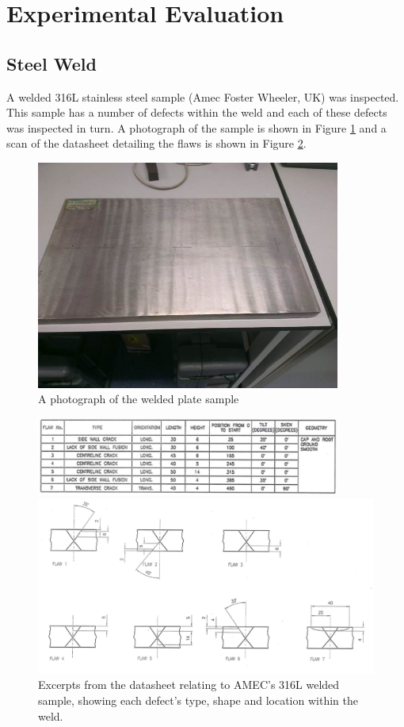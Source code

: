  \section{Experimental Evaluation}

 \subsection{Steel Weld}

 A welded 316L stainless steel sample (Amec Foster Wheeler, UK) was inspected. This sample has a number of defects within the weld and each of these defects was inspected in turn. A photograph of the sample is shown in Figure \ref{fig:amec_1} and a scan of the datasheet detailing the flaws is shown in Figure \ref{fig:amec2}.

\begin{figure}[htb]
\centering
		\includegraphics[width=100mm]{AMEC_1.png}
		\caption{A photograph of the welded plate sample}
		\label{fig:amec_1}
\end{figure}

\begin{figure}[p]
\centering
		\includegraphics[width=100mm]{AMEC2_1.png}
		
		\vspace{10mm}
		
		\includegraphics[width=\textwidth]{AMEC12_1.png}
		\caption{Excerpts from the datasheet relating to AMEC's 316L welded sample, showing each defect's type, shape and location within the weld.}
		\label{fig:amec2}
\end{figure}

